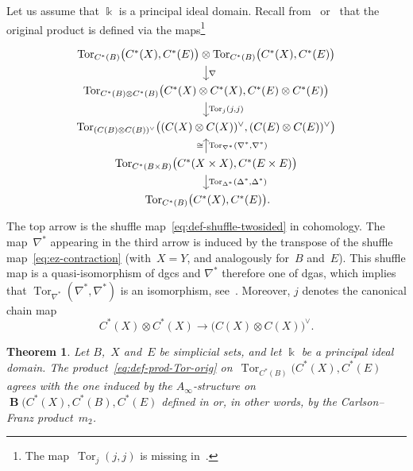 \documentclass[letterpaper]{amsart}
\numberwithin{equation}{section}
\theoremstyle{plain}
\newtheorem{theorem}{Theorem}[section]
\theoremstyle{definition}
\theoremstyle{remark}
\DeclareMathOperator{\Tor}{Tor}
\def\Ainf{A_{\infty}}
\DeclareMathOperator{\BB}{\mathbf{B}}
\def\kk{\Bbbk}
\let\shuffle\nabla
\begin{document}
Let us assume that $\kk$ is a principal ideal domain.
Recall from~\cite[Prop.~I.3.4]{Smith:1967} or~\cite[Prop.~7.17]{McCleary:2001}
that the original product is defined via the maps\footnote{%
  The map~$\Tor_{j}(j,j)$ is missing in~\cite{Smith:1967}.}
\begin{equation}
  \label{eq:def-prod-Tor-orig}
  \begin{tikzcd}[row sep=scriptsize]
    \Tor_{C^{*}(B)}\bigl(C^{*}(X),C^{*}(E)\bigr) \otimes \Tor_{C^{*}(B)}\bigl(C^{*}(X),C^{*}(E)\bigr) \arrow{d}{\shuffle} \\
    \Tor_{C^{*}(B)\otimes C^{*}(B)}\bigl(C^{*}(X)\otimes C^{*}(X),C^{*}(E)\otimes C^{*}(E)\bigr)
      \arrow{d}{\Tor_{j}(j,j)} \\
    \Tor_{(C(B)\otimes C(B))^{\vee}}\bigl((C(X)\otimes C(X))^{\vee},(C(E)\otimes C(E))^{\vee}\bigr) \\
    \Tor_{C^{*}(B\times B)}\bigl(C^{*}(X\times X),C^{*}(E\times E)\bigr)
      \arrow{u}[right]{\Tor_{\shuffle^{*}}(\shuffle^{*},\shuffle^{*})}[left]{\cong} \arrow{d}{\Tor_{\Delta^{*}}(\Delta^{*},\Delta^{*})} \\
    \Tor_{C^{*}(B)}\bigl(C^{*}(X),C^{*}(E)\bigr) \mathrlap{.}
  \end{tikzcd}
\end{equation}
The top arrow is the shuffle map~\eqref{eq:def-shuffle-twosided} in cohomology.
The map~$\shuffle^{*}$ appearing in the third arrow is induced by the transpose of the shuffle map~\eqref{eq:ez-contraction}
(with~$X=Y$, and analogously for~$B$ and~$E$).
This shuffle map is a quasi-isomorphism of dgcs and $\shuffle^{*}$ therefore one of dgas,
which implies that $\Tor_{\shuffle^{*}}(\shuffle^{*},\shuffle^{*})$ is an isomorphism, see~\cite[Cor.~1.8, proof of Cor.~3.5]{GugenheimMay:1974}.
Moreover, $j$ denotes the canonical chain map
\begin{equation}
  C^{*}(X)\otimes C^{*}(X) \to \bigl(C(X)\otimes C(X)\bigr)^{\vee}.
\end{equation}

\begin{theorem}
  \label{thm:comparison-products}
  Let $B$,~$X$ and~$E$ be simplicial sets, and let $\kk$ be a principal ideal domain.
  The product~\eqref{eq:def-prod-Tor-orig} on~$\Tor_{C^{*}(B)}\bigl(C^{*}(X),C^{*}(E)$
  agrees with the one induced by the $\Ainf$-structure on $\BB(C^{*}(X),C^{*}(B),C^{*}(E)$
  defined in  or, in other words, by the Carlson--Franz product~$m_{2}$.
\end{theorem}
\end{document}
